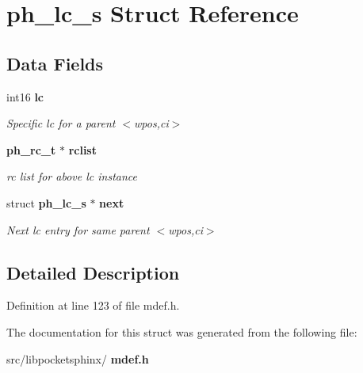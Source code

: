 \section{ph\+\_\+lc\+\_\+s Struct Reference}
\label{structph__lc__s}
\subsection*{Data Fields}
\begin{DoxyCompactItemize}
\item 
\mbox{\label{structph__lc__s_adfb4e9553a4e2314543f9f1ef661185e}} 
int16 \textbf{ lc}
\begin{DoxyCompactList}\small\item\em Specific lc for a parent $<$wpos,ci$>$ \end{DoxyCompactList}\item 
\mbox{\label{structph__lc__s_aac24b848d70d96894c312d16050c4051}} 
\textbf{ ph\+\_\+rc\+\_\+t} $\ast$ \textbf{ rclist}
\begin{DoxyCompactList}\small\item\em rc list for above lc instance \end{DoxyCompactList}\item 
\mbox{\label{structph__lc__s_a5cda7044037678163c2242dde19df13a}} 
struct \textbf{ ph\+\_\+lc\+\_\+s} $\ast$ \textbf{ next}
\begin{DoxyCompactList}\small\item\em Next lc entry for same parent $<$wpos,ci$>$ \end{DoxyCompactList}\end{DoxyCompactItemize}


\subsection{Detailed Description}


Definition at line 123 of file mdef.\+h.



The documentation for this struct was generated from the following file\+:\begin{DoxyCompactItemize}
\item 
src/libpocketsphinx/\textbf{ mdef.\+h}\end{DoxyCompactItemize}
